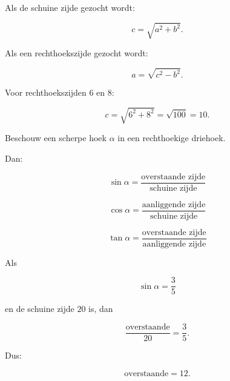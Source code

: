 \documentclass{ximera}
\begin{document}
Als de schuine zijde gezocht wordt:

\[
c=\sqrt{a^2+b^2}.
\]

Als een rechthoekszijde gezocht wordt:

\[
a=\sqrt{c^2-b^2}.
\]


\begin{voorbeeld}
Voor rechthoekszijden \(6\) en \(8\):

\[
c
=
\sqrt{6^2+8^2}
=
\sqrt{100}
=
10.
\]
\end{voorbeeld}



Beschouw een scherpe hoek \(\alpha\) in een rechthoekige driehoek.


\begin{center}
\end{center}


Dan:

\[
\boxed{
\sin\alpha
=
\frac{\text{overstaande zijde}}{\text{schuine zijde}}
}
\]

\[
\boxed{
\cos\alpha
=
\frac{\text{aanliggende zijde}}{\text{schuine zijde}}
}
\]

\[
\boxed{
\tan\alpha
=
\frac{\text{overstaande zijde}}{\text{aanliggende zijde}}
}
\]


\begin{voorbeeld}

Als

\[
\sin\alpha=\frac35
\]

en de schuine zijde \(20\) is, dan

\[
\frac{\text{overstaande}}{20}
=
\frac35.
\]

Dus:

\[
\text{overstaande}=12.
\]
\end{voorbeeld}
\end{document}

